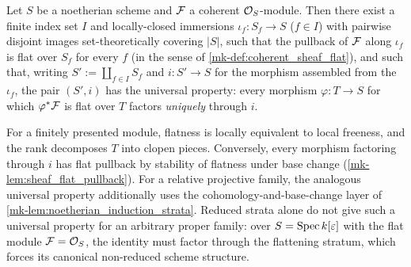 \begin{theorem}[Universal property of the flat-locus stratification (case
  \(n = 0\))]
  \label{mk-thm:flattening_stratification_universal}
  \leanok

  Let \(S\) be a noetherian scheme and \(\mathcal{F}\) a coherent \(\mathcal{O}_S\)-module.
  Then there exist a finite index set \(I\) and locally-closed immersions
  \(\iota_f : S_f \to S\) (\(f \in I\)) with pairwise disjoint images
  set-theoretically covering \(|S|\), such that the pullback of \(\mathcal{F}\)
  along \(\iota_f\) is flat over \(S_f\) for every \(f\) (in the sense of
  \ref{mk-def:coherent_sheaf_flat}), and such that, writing
  \(S' := \coprod_{f \in I} S_f\) and \(i : S' \to S\) for the morphism
  assembled from the \(\iota_f\), the pair \((S', i)\) has the universal
  property: every morphism \(\varphi : T \to S\) for which
  \(\varphi^* \mathcal{F}\) is flat over \(T\) factors \emph{uniquely} through
  \(i\).

  For a finitely presented module, flatness is locally equivalent to local
  freeness, and the rank decomposes \(T\) into clopen pieces.  Conversely,
  every morphism factoring through \(i\) has flat pullback by stability of
  flatness under base change (\ref{mk-lem:sheaf_flat_pullback}).  For a relative
  projective family, the analogous universal property additionally uses the
  cohomology-and-base-change layer of
  \ref{mk-lem:noetherian_induction_strata}.  Reduced strata alone do not give
  such a universal property for an arbitrary proper family: over
  \(S = \operatorname{Spec} k[\varepsilon]\) with the flat module \(\mathcal{F} = \mathcal{O}_S\), the
  identity must factor through the flattening stratum, which forces its
  canonical non-reduced scheme structure.
\end{theorem}

